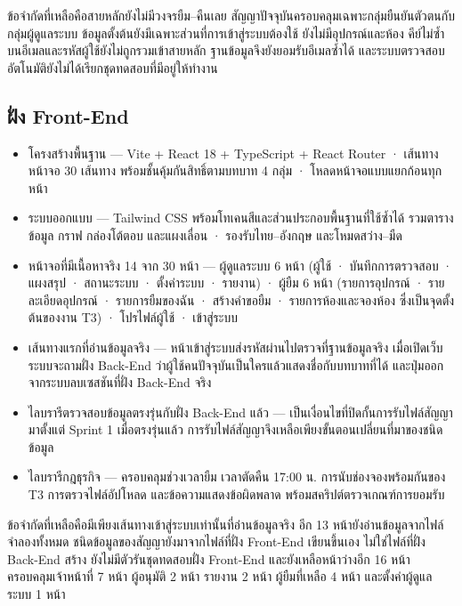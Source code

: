 ข้อจำกัดที่เหลือคือสายหลักยังไม่มีวงจรยืม–คืนเลย สัญญาปัจจุบันครอบคลุมเฉพาะกลุ่มยืนยันตัวตนกับกลุ่มผู้ดูแลระบบ ข้อมูลตั้งต้นยังมีเฉพาะส่วนที่การเข้าสู่ระบบต้องใช้ ยังไม่มีอุปกรณ์และห้อง คีย์ไม่ซ้ำบนอีเมลและรหัสผู้ใช้ยังไม่ถูกรวมเข้าสายหลัก ฐานข้อมูลจึงยังยอมรับอีเมลซ้ำได้ และระบบตรวจสอบอัตโนมัติยังไม่ได้เรียกชุดทดสอบที่มีอยู่ให้ทำงาน

\subsection{ฝั่ง Front-End}

\begin{itemize}
  \item โครงสร้างพื้นฐาน — Vite + React 18 + TypeScript + React Router · เส้นทางหน้าจอ 30 เส้นทาง พร้อมชั้นคุ้มกันสิทธิ์ตามบทบาท 4 กลุ่ม · โหลดหน้าจอแบบแยกก้อนทุกหน้า
  \item ระบบออกแบบ — Tailwind CSS พร้อมโทเคนสีและส่วนประกอบพื้นฐานที่ใช้ซ้ำได้ รวมตารางข้อมูล กราฟ กล่องโต้ตอบ และแผงเลื่อน · รองรับไทย–อังกฤษ และโหมดสว่าง–มืด
  \item หน้าจอที่มีเนื้อหาจริง 14 จาก 30 หน้า — ผู้ดูแลระบบ 6 หน้า (ผู้ใช้ · บันทึกการตรวจสอบ · แผงสรุป · สถานะระบบ · ตั้งค่าระบบ · รายงาน) · ผู้ยืม 6 หน้า (รายการอุปกรณ์ · รายละเอียดอุปกรณ์ · รายการยืมของฉัน · สร้างคำขอยืม · รายการห้องและจองห้อง ซึ่งเป็นจุดตั้งต้นของงาน T3) · โปรไฟล์ผู้ใช้ · เข้าสู่ระบบ
  \item เส้นทางแรกที่อ่านข้อมูลจริง — หน้าเข้าสู่ระบบส่งรหัสผ่านไปตรวจที่ฐานข้อมูลจริง เมื่อเปิดเว็บระบบจะถามฝั่ง Back-End ว่าผู้ใช้คนปัจจุบันเป็นใครแล้วแสดงชื่อกับบทบาทที่ได้ และปุ่มออกจากระบบลบเซสชันที่ฝั่ง Back-End จริง
  \item ไลบรารีตรวจสอบข้อมูลตรงรุ่นกับฝั่ง Back-End แล้ว — เป็นเงื่อนไขที่ปิดกั้นการรับไฟล์สัญญามาตั้งแต่ Sprint 1 เมื่อตรงรุ่นแล้ว การรับไฟล์สัญญาจึงเหลือเพียงขั้นตอนเปลี่ยนที่มาของชนิดข้อมูล
  \item ไลบรารีกฎธุรกิจ — ครอบคลุมช่วงเวลายืม เวลาตัดคืน 17:00 น. การนับช่องจองพร้อมกันของ T3 การตรวจไฟล์อัปโหลด และข้อความแสดงข้อผิดพลาด พร้อมสคริปต์ตรวจเกณฑ์การยอมรับ
\end{itemize}

ข้อจำกัดที่เหลือคือมีเพียงเส้นทางเข้าสู่ระบบเท่านั้นที่อ่านข้อมูลจริง อีก 13 หน้ายังอ่านข้อมูลจากไฟล์จำลองทั้งหมด ชนิดข้อมูลของสัญญายังมาจากไฟล์ที่ฝั่ง Front-End เขียนขึ้นเอง ไม่ใช่ไฟล์ที่ฝั่ง Back-End สร้าง ยังไม่มีตัวรันชุดทดสอบฝั่ง Front-End และยังเหลือหน้าว่างอีก 16 หน้า ครอบคลุมเจ้าหน้าที่ 7 หน้า ผู้อนุมัติ 2 หน้า รายงาน 2 หน้า ผู้ยืมที่เหลือ 4 หน้า และตั้งค่าผู้ดูแลระบบ 1 หน้า

